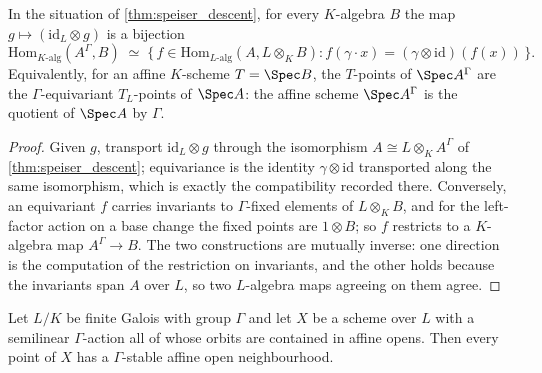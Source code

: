 \begin{theorem}\leanok
  \label{thm:galois_quotient_points}
  In the situation of \cref{thm:speiser_descent}, for every \(K\)-algebra \(B\)
  the map \(g \mapsto (\mathrm{id}_L \otimes g)\) is a bijection
  \[
    \mathrm{Hom}_{K\text{-alg}}(A^\Gamma, B)
      \;\simeq\;
    \{\, f \in \mathrm{Hom}_{L\text{-alg}}(A, L \otimes_K B) :
       f(\gamma \cdot x) = (\gamma \otimes \mathrm{id})(f(x)) \,\}.
  \]
  Equivalently, for an affine \(K\)-scheme \(T = \Spec B\), the \(T\)-points of
  \(\Spec A^\Gamma\) are the \(\Gamma\)-equivariant \(T_L\)-points of
  \(\Spec A\): the affine scheme \(\Spec A^\Gamma\) is the quotient of
  \(\Spec A\) by \(\Gamma\).
\end{theorem}

\begin{proof}\leanok
  Given \(g\), transport \(\mathrm{id}_L \otimes g\) through the isomorphism
  \(A \cong L \otimes_K A^\Gamma\) of \cref{thm:speiser_descent}; equivariance is
  the identity \(\gamma \otimes \mathrm{id}\) transported along the same
  isomorphism, which is exactly the compatibility recorded there. Conversely, an
  equivariant \(f\) carries invariants to \(\Gamma\)-fixed elements of
  \(L \otimes_K B\), and for the left-factor action on a base change the fixed
  points are \(1 \otimes B\); so \(f\) restricts to a \(K\)-algebra map
  \(A^\Gamma \to B\). The two constructions are mutually inverse: one direction
  is the computation of the restriction on invariants, and the other holds
  because the invariants span \(A\) over \(L\), so two \(L\)-algebra maps
  agreeing on them agree.
\end{proof}

\begin{lemma}\leanok
  \label{lem:stable_affine_open}
  Let \(L/K\) be finite Galois with group \(\Gamma\) and let \(X\) be a scheme
  over \(L\) with a semilinear \(\Gamma\)-action all of whose orbits are
  contained in affine opens. Then every point of \(X\) has a \(\Gamma\)-stable
  affine open neighbourhood.
\end{lemma}

